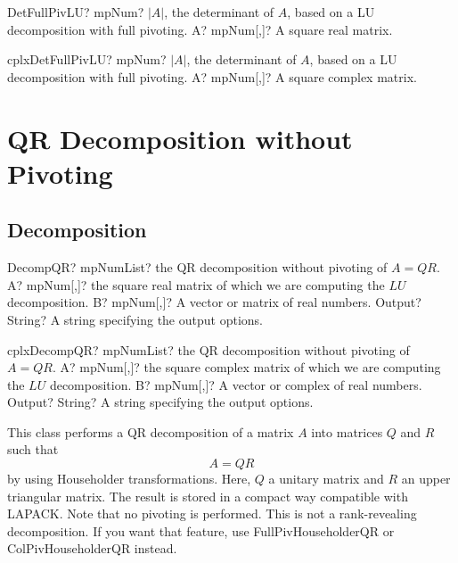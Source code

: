 \begin{mpFunctionsExtract}
	\mpFunctionOne
	{DetFullPivLU? mpNum? $|A|$, the determinant of $A$, based on a LU decomposition with full pivoting.}
	{A? mpNum[,]? A square real matrix.}
\end{mpFunctionsExtract}

\vspace{0.6cm}
\begin{mpFunctionsExtract}
	\mpFunctionOne
	{cplxDetFullPivLU? mpNum? $|A|$, the determinant of $A$, based on a LU decomposition with full pivoting.}
	{A? mpNum[,]? A square complex matrix.}
\end{mpFunctionsExtract}





\newpage
\section{QR Decomposition without Pivoting}
\label{QR Decomposition without Pivoting}




\subsection{Decomposition}


\begin{mpFunctionsExtract}
	\mpFunctionThree
	{DecompQR? mpNumList? the QR decomposition without pivoting of $A = QR$.}
	{A? mpNum[,]? the square real matrix of which we are computing the $LU$ decomposition.}
	{B? mpNum[,]? A vector or matrix of real numbers.}
	{Output? String? A string specifying the output options.}
\end{mpFunctionsExtract}

\vspace{0.6cm}
\begin{mpFunctionsExtract}
	\mpFunctionThree
	{cplxDecompQR? mpNumList? the QR decomposition without pivoting of $A = QR$.}
	{A? mpNum[,]? the square complex matrix of which we are computing the $LU$ decomposition.}
	{B? mpNum[,]? A vector or complex of real numbers.}
	{Output? String? A string specifying the output options.}
\end{mpFunctionsExtract}


\vspace{0.3cm}

This class performs a QR decomposition of a matrix $A$ into matrices $Q$ and $R$ such that
\begin{equation}
A=QR
\end{equation} 
by using Householder transformations. Here, $Q$ a unitary matrix and $R$ an upper triangular matrix. The result is stored in a compact way compatible with LAPACK.
Note that no pivoting is performed. This is not a rank-revealing decomposition. If you want that feature, use \textsf{FullPivHouseholderQR} or \textsf{ColPivHouseholderQR} instead.

